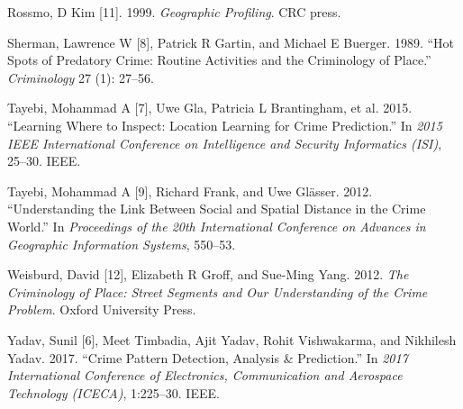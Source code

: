 \documentclass[conference,final,]{IEEEtran}
\newlength{\cslhangindent}
\newenvironment{CSLReferences}[2] %
 {\begin{list}{}{%
  \setlength{\itemindent}{0pt}
  \setlength{\leftmargin}{0pt}
  \setlength{\parsep}{0pt}
  \ifodd #1
   \setlength{\leftmargin}{\cslhangindent}
   \setlength{\itemindent}{-1\cslhangindent}
  \fi
  \setlength{\itemsep}{#2\baselineskip}}}
 {\end{list}}
\begin{document}
\begin{CSLReferences}{1}{0}
Rossmo, D Kim {[}11{]}. 1999. \emph{Geographic Profiling}. CRC press.

Sherman, Lawrence W {[}8{]}, Patrick R Gartin, and Michael E Buerger.
1989. {``Hot Spots of Predatory Crime: Routine Activities and the
Criminology of Place.''} \emph{Criminology} 27 (1): 27--56.

Tayebi, Mohammad A {[}7{]}, Uwe Gla, Patricia L Brantingham, et al.
2015. {``Learning Where to Inspect: Location Learning for Crime
Prediction.''} In \emph{2015 IEEE International Conference on
Intelligence and Security Informatics (ISI)}, 25--30. IEEE.

Tayebi, Mohammad A {[}9{]}, Richard Frank, and Uwe Glässer. 2012.
{``Understanding the Link Between Social and Spatial Distance in the
Crime World.''} In \emph{Proceedings of the 20th International
Conference on Advances in Geographic Information Systems}, 550--53.

Weisburd, David {[}12{]}, Elizabeth R Groff, and Sue-Ming Yang. 2012.
\emph{The Criminology of Place: Street Segments and Our Understanding of
the Crime Problem}. Oxford University Press.

Yadav, Sunil {[}6{]}, Meet Timbadia, Ajit Yadav, Rohit Vishwakarma, and
Nikhilesh Yadav. 2017. {``Crime Pattern Detection, Analysis \&
Prediction.''} In \emph{2017 International Conference of Electronics,
Communication and Aerospace Technology (ICECA)}, 1:225--30. IEEE.

\end{CSLReferences}
\end{document}
